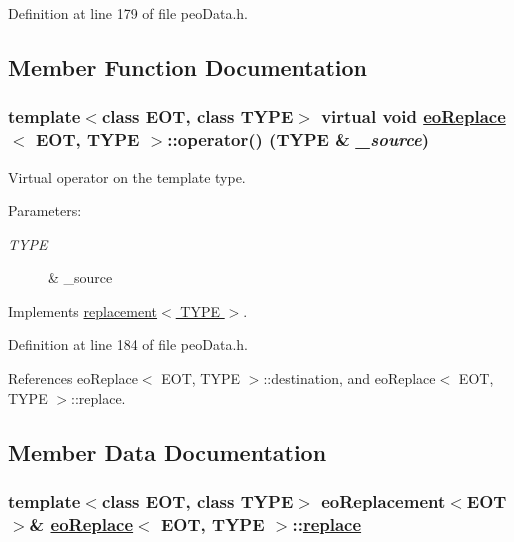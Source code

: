 Definition at line 179 of file peo\-Data.h.

\subsection{Member Function Documentation}
\hypertarget{classeoReplace_786659edbd9907000138aa29caf46065}{
\subsubsection[operator()]{\setlength{\rightskip}{0pt plus 5cm}template$<$class EOT, class TYPE$>$ virtual void \hyperlink{classeoReplace}{eo\-Replace}$<$ EOT, TYPE $>$::operator() (TYPE \& {\em \_\-source})}}
\label{classeoReplace_786659edbd9907000138aa29caf46065}


Virtual operator on the template type. 

\begin{Desc}
\item[Parameters:]
\begin{description}
\item[{\em TYPE}]\& \_\-source \end{description}
\end{Desc}


Implements \hyperlink{classreplacement_2c21feaad602bb9d691f0081ac4363b1}{replacement$<$ TYPE $>$}.

Definition at line 184 of file peo\-Data.h.

References eo\-Replace$<$ EOT, TYPE $>$::destination, and eo\-Replace$<$ EOT, TYPE $>$::replace.

\subsection{Member Data Documentation}
\hypertarget{classeoReplace_b324e455db7f97021b0b7224a804b3e9}{
\subsubsection[replace]{\setlength{\rightskip}{0pt plus 5cm}template$<$class EOT, class TYPE$>$ \bf{eo\-Replacement}$<$EOT$>$\& \hyperlink{classeoReplace}{eo\-Replace}$<$ EOT, TYPE $>$::\hyperlink{classeoReplace_b324e455db7f97021b0b7224a804b3e9}{replace}}}
\label{classeoReplace_b324e455db7f97021b0b7224a804b3e9}


